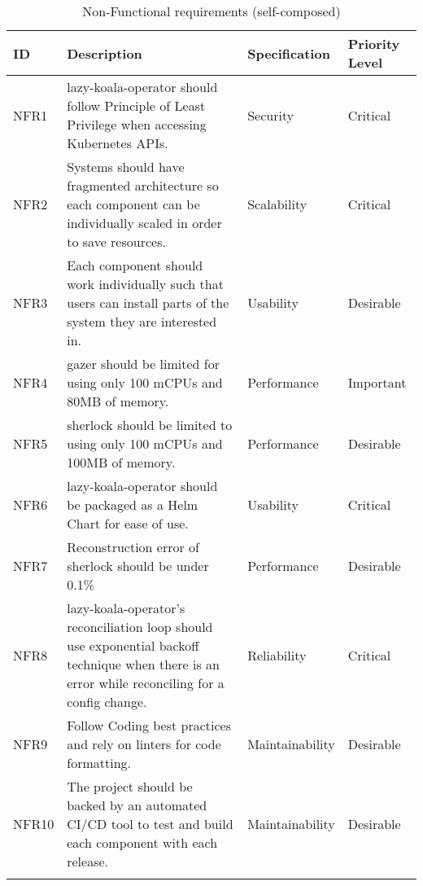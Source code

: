 \begin{longtable}{|p{13mm}|p{89mm}|p{26mm}|p{18mm}|}
\hline
    \textbf{ID} &
    \textbf{Description} &
    \textbf{Specification} &
    \textbf{Priority Level} \\ \hline
    
    NFR1 &
    \ac{lazy-koala-operator} should follow Principle of Least Privilege when accessing Kubernetes APIs. &
    Security &
    Critical \\ \hline
    
    NFR2 &
    Systems should have fragmented architecture so each component can be individually scaled in order to save resources. &
    Scalability &
    Critical \\ \hline
    
    NFR3 &
    Each component should work individually such that users can install parts of the system they are interested in. &
    Usability &
    Desirable \\ \hline
    
    NFR4 &
    \ac{gazer} should be limited for using only 100 mCPUs and 80MB of memory. &
    Performance &
    Important \\ \hline
    
    NFR5 &
    \ac{sherlock} should be limited to using only 100 mCPUs and 100MB of memory. &
    Performance &
    Desirable \\ \hline
    
    NFR6 &
    \ac{lazy-koala-operator} should be packaged as a Helm Chart for ease of use. &
    Usability &
    Critical \\ \hline
    
    NFR7 &
    Reconstruction error of \ac{sherlock} should be under 0.1\% &
    Performance &
    Desirable \\ \hline
    
    NFR8 &
    \ac{lazy-koala-operator}’s reconciliation loop should use exponential backoff technique when there is an error while reconciling for a config change. &
    Reliability &
    Critical \\ \hline
    
    NFR9 &
    Follow Coding best practices and rely on linters for code formatting. &
    Maintainability &
    Desirable \\ \hline
    
    NFR10 &
    The project should be backed by an automated CI/CD tool to test and build each component with each release. &
    Maintainability &
    Desirable \\ \hline

\caption{Non-Functional requirements (self-composed)}
\end{longtable}